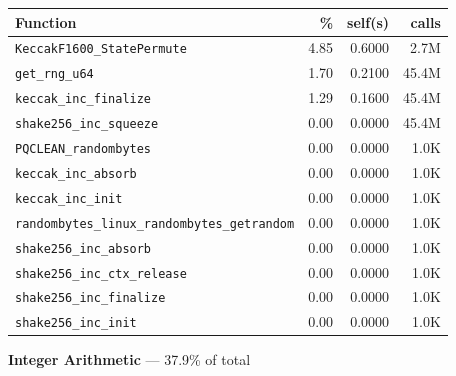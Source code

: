 \documentclass[11pt,a4paper]{article}
\begin{document}
\begin{longtable}{p{7.5cm}rrr}
\toprule
Function & \% & self(s) & calls \\
\midrule
\endhead
  \texttt{KeccakF1600\_StatePermute} & 4.85 & 0.6000 & 2.7M \\
  \texttt{get\_rng\_u64} & 1.70 & 0.2100 & 45.4M \\
  \texttt{keccak\_inc\_finalize} & 1.29 & 0.1600 & 45.4M \\
  \texttt{shake256\_inc\_squeeze} & 0.00 & 0.0000 & 45.4M \\
  \texttt{PQCLEAN\_randombytes} & 0.00 & 0.0000 & 1.0K \\
  \texttt{keccak\_inc\_absorb} & 0.00 & 0.0000 & 1.0K \\
  \texttt{keccak\_inc\_init} & 0.00 & 0.0000 & 1.0K \\
  \texttt{randombytes\_linux\_randombytes\_getrandom} & 0.00 & 0.0000 & 1.0K \\
  \texttt{shake256\_inc\_absorb} & 0.00 & 0.0000 & 1.0K \\
  \texttt{shake256\_inc\_ctx\_release} & 0.00 & 0.0000 & 1.0K \\
  \texttt{shake256\_inc\_finalize} & 0.00 & 0.0000 & 1.0K \\
  \texttt{shake256\_inc\_init} & 0.00 & 0.0000 & 1.0K \\
\bottomrule
\end{longtable}

\noindent\colorbox{intcolor}{\strut \textbf{Integer Arithmetic} --- 37.9\% of total}
\vspace{2pt}
\end{document}
